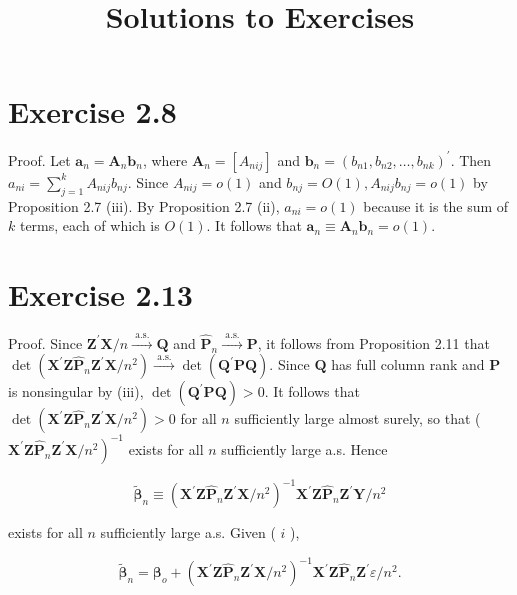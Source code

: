 \documentclass[10pt]{article}
\title{Solutions to Exercises}
\author{}
\date{}
\begin{document}
\maketitle

\section*{Exercise 2.8}
Proof. Let $\mathbf{a}_{n}=\mathbf{A}_{n} \mathbf{b}_{n}$, where $\mathbf{A}_{n}=\left[A_{n i j}\right]$ and $\mathbf{b}_{n}=\left(b_{n 1}, b_{n 2}, \ldots, b_{n k}\right)^{\prime}$. Then $a_{n i}=\sum_{j=1}^{k} A_{n i j} b_{n j}$. Since $A_{n i j}=o(1)$ and $b_{n j}=O(1), A_{n i j} b_{n j}= o(1)$ by Proposition 2.7 (iii). By Proposition 2.7 (ii), $a_{n i}=o(1)$ because it is the sum of $k$ terms, each of which is $O(1)$. It follows that $\mathbf{a}_{n} \equiv \mathbf{A}_{n} \mathbf{b}_{n}=o(1)$.

\section*{Exercise 2.13}
Proof. Since $\mathbf{Z}^{\prime} \mathbf{X} / n \xrightarrow{\text { a.s. }} \mathbf{Q}$ and $\hat{\mathbf{P}}_{n} \xrightarrow{\text { a.s. }} \mathbf{P}$, it follows from Proposition 2.11 that $\operatorname{det}\left(\mathbf{X}^{\prime} \mathbf{Z} \hat{\mathbf{P}}_{n} \mathbf{Z}^{\prime} \mathbf{X} / n^{2}\right) \xrightarrow{\text { a.s. }} \operatorname{det}\left(\mathbf{Q}^{\prime} \mathbf{P Q}\right)$. Since $\mathbf{Q}$ has full column rank and $\mathbf{P}$ is nonsingular by (iii), $\operatorname{det}\left(\mathbf{Q}^{\prime} \mathbf{P Q}\right)>0$. It follows that $\operatorname{det}\left(\mathbf{X}^{\prime} \mathbf{Z} \hat{\mathbf{P}}_{n} \mathbf{Z}^{\prime} \mathbf{X} / n^{2}\right)>0$ for all $n$ sufficiently large almost surely, so that ( $\left.\mathbf{X}^{\prime} \mathbf{Z} \hat{\mathbf{P}}_{n} \mathbf{Z}^{\prime} \mathbf{X} / n^{2}\right)^{-1}$ exists for all $n$ sufficiently large a.s. Hence

$$
\tilde{\boldsymbol{\beta}}_{n} \equiv\left(\mathbf{X}^{\prime} \mathbf{Z} \hat{\mathbf{P}}_{n} \mathbf{Z}^{\prime} \mathbf{X} / n^{2}\right)^{-1} \mathbf{X}^{\prime} \mathbf{Z} \hat{\mathbf{P}}_{n} \mathbf{Z}^{\prime} \mathbf{Y} / n^{2}
$$

exists for all $n$ sufficiently large a.s. Given ( $i$ ),

$$
\tilde{\boldsymbol{\beta}}_{n}=\boldsymbol{\beta}_{o}+\left(\mathbf{X}^{\prime} \mathbf{Z} \hat{\mathbf{P}}_{n} \mathbf{Z}^{\prime} \mathbf{X} / n^{2}\right)^{-1} \mathbf{X}^{\prime} \mathbf{Z} \hat{\mathbf{P}}_{n} \mathbf{Z}^{\prime} \varepsilon / n^{2} .
$$
\end{document}
